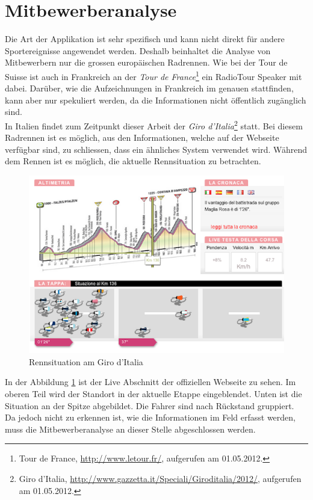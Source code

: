 \section{Mitbewerberanalyse}
Die Art der Applikation ist sehr spezifisch und kann nicht direkt für andere Sportereignisse angewendet werden. Deshalb beinhaltet die Analyse von Mitbewerbern nur die grossen europäischen Radrennen. Wie bei der Tour de Suisse ist auch in Frankreich an der \textit{Tour de France}\footnote{Tour de France, \url{http://www.letour.fr/}, aufgerufen am 01.05.2012.} ein RadioTour Speaker mit dabei. Darüber, wie die Aufzeichnungen in Frankreich im genauen stattfinden, kann aber nur spekuliert werden, da die Informationen nicht öffentlich zugänglich sind.
\\
In Italien findet zum Zeitpunkt dieser Arbeit der \textit{Giro d'Italia}\footnote{Giro d'Italia,  \url{http://www.gazzetta.it/Speciali/Giroditalia/2012/}, aufgerufen am 01.05.2012.} statt. Bei diesem Radrennen ist es möglich, aus den Informationen, welche auf der Webseite verfügbar sind, zu schliessen, dass ein ähnliches System verwendet wird. Während dem Rennen ist es möglich, die aktuelle Rennsituation zu betrachten.

\begin{figure}[h!]
\caption{Rennsituation am Giro d'Italia}
\label{fig:giro}
\includegraphics[scale=0.7]{05bericht/images/giro.png}
\end{figure} 

In der Abbildung \ref{fig:giro} ist der Live Abschnitt der offiziellen Webseite zu sehen. Im oberen Teil wird der Standort in der aktuelle Etappe eingeblendet. Unten ist die Situation an der Spitze abgebildet. Die Fahrer sind nach Rückstand gruppiert.
\\
Da jedoch nicht zu erkennen ist, wie die Informationen im Feld erfasst werden, muss die Mitbewerberanalyse an dieser Stelle abgeschlossen werden.
